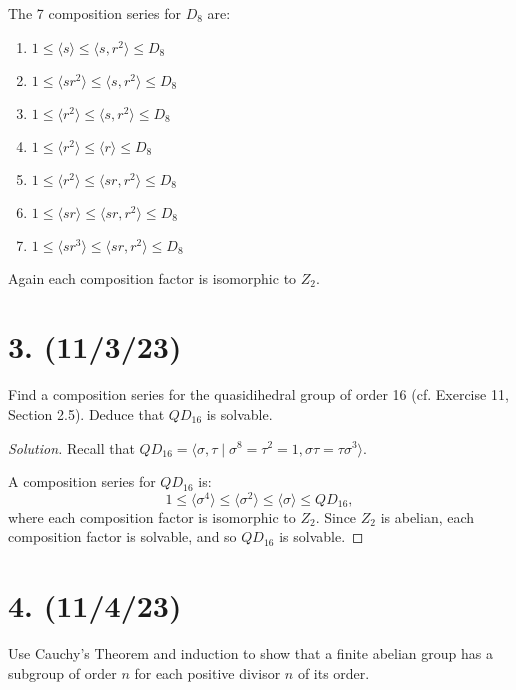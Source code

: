 \documentclass{article}
\begin{document}
The 7 composition series for $D_8$ are:
\begin{enumerate}[itemsep=0em]
    \item $1 \leq \langle s \rangle \leq \langle s, r^2 \rangle \leq D_8$
    \item $1 \leq \langle sr^2 \rangle \leq \langle s, r^2 \rangle \leq D_8$
    \item $1 \leq \langle r^2 \rangle \leq \langle s, r^2 \rangle \leq D_8$
    \item $1 \leq \langle r^2 \rangle \leq \langle r \rangle \leq D_8$
    \item $1 \leq \langle r^2 \rangle \leq \langle sr, r^2 \rangle \leq D_8$
    \item $1 \leq \langle sr \rangle \leq \langle sr, r^2 \rangle \leq D_8$
    \item $1 \leq \langle sr^3 \rangle \leq \langle sr, r^2 \rangle \leq D_8$
\end{enumerate}
Again each composition factor is isomorphic to $Z_2$.

\section*{3. (11/3/23)}

Find a composition series for the quasidihedral group of order 16 (cf. Exercise 11, Section 2.5). Deduce that $QD_{16}$ is solvable.

\begin{proof}[Solution]
    Recall that $QD_{16} = \langle \sigma, \tau \mid \sigma^8 = \tau^2 = 1, \sigma \tau = \tau \sigma^3 \rangle$.

    A composition series for $QD_{16}$ is:
    \begin{equation*}
        1 \leq \langle \sigma^4 \rangle \leq \langle \sigma^2 \rangle \leq \langle \sigma \rangle \leq QD_{16},
    \end{equation*}
    where each composition factor is isomorphic to $Z_2$. Since $Z_2$ is abelian, each composition factor is solvable, and so $QD_{16}$ is solvable.
\end{proof}

\section*{4. (11/4/23)}

Use Cauchy's Theorem and induction to show that a finite abelian group has a subgroup of order $n$ for each positive divisor $n$ of its order.
\end{document}
